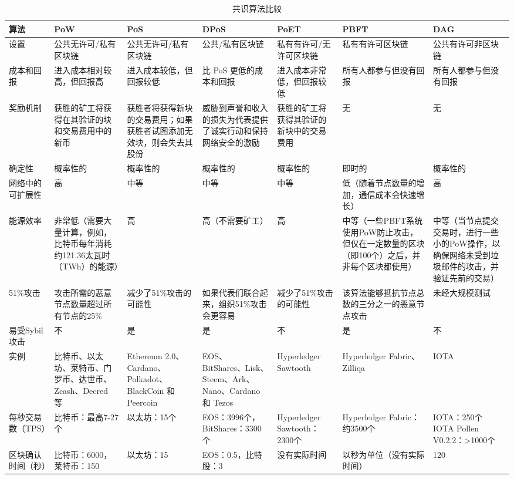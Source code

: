 \begin{translation}
\begin{longtable}        {|p{1cm}|p{2cm}|p{2cm}|p{2cm}|p{2cm}|p{2cm}|p{2cm}|}
    \caption{共识算法比较\cite{art13,art37,art38,art39,art40}}
    \label{tab:共识算法比较} \\
    \hline 
    算法 & PoW & PoS & DPoS & PoET & PBFT & DAG \\ 
    \hline 设置 & 公共无许可/私有区块链 & 公共无许可/私有区块链 & 公共/私有区块链 & 私有有许可/无许可区块链 & 私有有许可区块链 & 公共有许可非区块链 \\
    \hline 成本和回报 & 进入成本相对较高，但回报高 & 进入成本较低，但回报较低 & 比 PoS 更低的成本和回报 & 进入成本非常低，但回报较低 & 所有人都参与但没有回报 & 所有人都参与但没有回报 \\
    \hline 奖励机制 & 获胜的矿工将获得在其验证的块和交易费用中的新币 & 获胜者将获得新块的交易费用；如果获胜者试图添加无效块，则会失去其股份 & 威胁到声誉和收入的损失为代表提供了诚实行动和保持网络安全的激励 & 获胜的矿工将获得其验证的新块中的交易费用 & 无 & 无 \\
    \hline 确定性 & 概率性的 & 概率性的 & 概率性的 & 概率性的 & 即时的 & 概率性的 \\
    \hline 网络中的可扩展性 & 高 &中等 & 中等 &中等 &低（随着节点数量的增加，通信成本会快速增长） & 高 \\
    \hline 能源效率 & 非常低（需要大量计算，例如，比特币每年消耗约121.36太瓦时（TWh）的能源） & 高 & 高（不需要矿工） & 高 & 中等（一些PBFT系统使用PoW防止攻击，但仅在一定数量的区块（即100个）之后，并非每个区块都使用） & 中等（当节点提交交易时，进行一些小的PoW操作，以确保网络未受到垃圾邮件的攻击，并验证先前的交易） \\
    \hline 51\%攻击 & 攻击所需的恶意节点数量超过所有节点的25\% & 减少了51\%攻击的可能性 & 如果代表们联合起来，组织51\%攻击会更容易 & 减少了51\%攻击的可能性 & 该算法能够抵抗节点总数的三分之一的恶意节点攻击 & 未经大规模测试 \\
    \hline 易受Sybil攻击 & 不 & 是 & 是 & 不 & 是 & 不 \\
    \hline 实例 & 比特币、以太坊、莱特币、门罗币、达世币、Zcash、Decred 等 & Ethereum 2.0、Cardano、Polkadot、BlackCoin 和 Peercoin & EOS、BitShares、Lisk、Steem、Ark、Nano、Cardano 和 Tezos & Hyperledger Sawtooth & Hyperledger Fabric、Zilliqa & IOTA \\
    \hline 每秒交易数（TPS） & 比特币：最高7-27个 & 以太坊：15个 & EOS：3996个，BitShares：3300个 & Hyperledger Sawtooth：2300个 & Hyperledger Fabric：约3500个 & IOTA：250个 IOTA Pollen V0.2.2：>1000个 \\
    \hline 区块确认时间（秒） & 比特币：6000，莱特币：150 & 以太坊：15 & EOS：0.5，比特股：3 & 没有实际时间 & 以秒为单位（没有实际时间） & 120 \\
    \hline
\end{longtable}



\end{translation}
